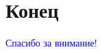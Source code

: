 
\section{Конец}

\begin{frame}
\centering
\vfill
\textcolor{Blue}{\Large Спасибо за внимание!}
\vfill
\end{frame}